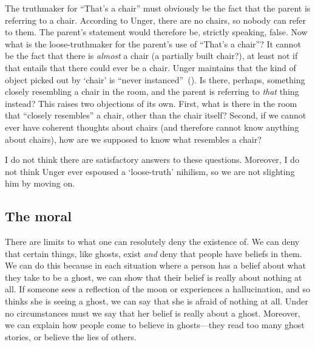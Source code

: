 \documentclass[11pt]{article}
\newcommand{\stage}[3]%
{%
	\begin{spacing}{1}%
	\vspace{0pt}
		\begin{description}[style=nextline, parsep=0pt, leftmargin=15mm, itemindent=-10mm, font=\mdseries]
			\item[\textsc{#1} \emph{#2}] #3
		\end{description}%
	\end{spacing}%
}
\begin{document}
\begin{spacing}{1.5}
The truthmaker for ``That's a chair'' must obviously be the fact that
the parent is referring to a chair.  According to Unger, there are no
chairs, so nobody can refer to them.  The parent's statement would
therefore be, strictly speaking, false.  Now what is the
loose-truthmaker for the parent's use of ``That's a chair''?  It cannot
be the fact that there is {\em almost} a chair (a partially built
chair?), at least not if that entails that there could ever be a
chair.  Unger maintains that the kind of object picked out by `chair'
is ``never instanced''~(\citeyear[147]{unger1979}).  Is there,
perhaps, something closely resembling a chair in the room, and the
parent is referring to {\em that} thing instead?  This raises two
objections of its own.  First, what is there in the room that
``closely resembles'' a chair, other than the chair itself?  Second, if
we cannot ever have coherent thoughts about chairs (and therefore
cannot know anything about chairs), how are we supposed to know what
resembles a chair?

I do not think there are satisfactory answers to these questions.
Moreover, I do not think Unger ever espoused a `loose-truth' nihilism,
so we are not slighting him by moving on.

%

\subsection{The moral}
\label{moral}
There are limits to what one can resolutely deny the existence of.  We
can deny that certain things, like ghosts, exist {\em and} deny that
people have beliefs in them.  We can do this because in each situation
where a person has a belief about what they take to be a ghost, we can
show that their belief is really about nothing at all.  If someone
sees a reflection of the moon or experiences a hallucination, and so
thinks she is seeing a ghost, we can say that she is afraid of nothing
at all.  Under no circumstances must we say that her belief is really
about a ghost.  Moreover, we can explain how people come to believe in
ghosts---they read too many ghost stories, or believe the lies of
others.


\end{spacing}
\end{document}
